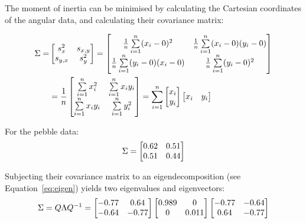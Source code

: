 The moment of inertia can be minimised by calculating the Cartesian
coordinates of the angular data, and calculating their covariance
matrix:

\begin{equation}
  \begin{split}
  \Sigma = &
  \left[
    \begin{array}{@{}cc@{}}
      s_x^2 & s_{x,y} \\
      s_{y,x} & s_y^2
    \end{array}
    \right] =
  \left[
    \begin{array}{@{}cc@{}}
      \frac{1}{n}\sum\limits_{i=1}^{n} (x_i-0)^2 & 
      \frac{1}{n}\sum\limits_{i=1}^{n} (x_i-0)(y_i-0) \\
      \frac{1}{n}\sum\limits_{i=1}^{n} (y_i-0)(x_i-0) &
      \frac{1}{n}\sum\limits_{i=1}^{n} (y_i-0)^2
    \end{array}
    \right] \\
  ~ & =
  \frac{1}{n}
  \left[
    \begin{array}{@{}cc@{}}
      \sum\limits_{i=1}^{n} x_i^2 & 
      \sum\limits_{i=1}^{n} x_iy_i \\
      \sum\limits_{i=1}^{n} x_iy_i &
      \sum\limits_{i=1}^{n} y_i^2
    \end{array}
    \right] =
  \sum\limits_{i=1}^{n}
  \left[
    \begin{array}{@{}c@{}}
      x_i \\ y_i
    \end{array}
    \right]
  \left[
    \begin{array}{@{}cc@{}}
      x_i & y_i
    \end{array}
    \right]
  \end{split}
  \label{eq:sphericalsigma}
\end{equation}

For the pebble data:
\[
\Sigma =
\left[
  \begin{array}{@{}cc@{}}
    0.62 & 0.51 \\
    0.51 & 0.44
  \end{array}
  \right]
\]
    
Subjecting their covariance matrix to an eigendecomposition (see
Equation~\ref{eq:eigen}) yields two eigenvalues and eigenvectors:
\[
\Sigma = Q \Lambda Q^{-1} =
\left[
  \begin{array}{@{}cc@{}}
    -0.77 & 0.64 \\
    -0.64 & -0.77
  \end{array}
  \right]
\left[
  \begin{array}{@{}cc@{}}
    0.989  & 0 \\
    0 & 0.011
  \end{array}
  \right]
\left[
  \begin{array}{@{}cc@{}}
    -0.77 & -0.64 \\
    0.64 & -0.77
  \end{array}
  \right]
\]

